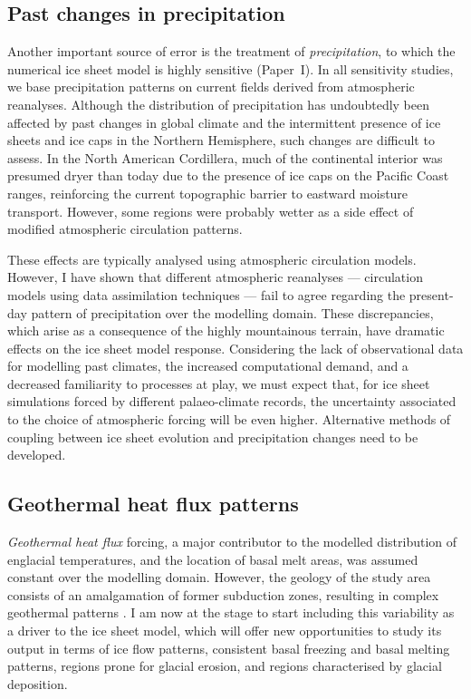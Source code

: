 \documentclass[a4paper]{kappa}
\newcommand{\CCLI}[0]{Paper~I}      %
\begin{document}
\subsection{Past changes in precipitation}

Another important source of error is the treatment of \emph{precipitation}, to
which
the numerical ice sheet model is highly sensitive (\CCLI). In all sensitivity
studies, we base precipitation patterns on current fields derived from
atmospheric
reanalyses. Although the distribution of precipitation has undoubtedly
been affected by past changes in global climate and the intermittent presence
of ice sheets and ice caps in the Northern Hemisphere, such changes are
difficult to assess. In the North American Cordillera, much of the continental
interior was presumed dryer than today due to the presence of ice caps on the
Pacific Coast ranges, reinforcing the current topographic barrier to eastward
moisture transport. However,
some regions were probably wetter as a side effect of modified atmospheric
circulation patterns.

These effects are typically analysed using atmospheric
circulation models. However, I have shown that different atmospheric reanalyses
--- circulation models using data assimilation techniques --- fail to agree
regarding the present-day pattern of precipitation over the modelling domain.
These discrepancies, which arise as a consequence of the highly mountainous
terrain, have dramatic effects on the ice sheet model response. Considering the
lack of observational data for modelling past climates, the increased
computational demand, and a decreased familiarity to processes at play, we must
expect that, for ice sheet simulations forced by different palaeo-climate
records, the uncertainty associated to the choice of atmospheric forcing
will be even higher. Alternative methods of coupling between ice sheet
evolution and precipitation changes need to be developed.


\subsection{Geothermal heat flux patterns}

\emph{Geothermal heat flux} forcing, a major contributor to the modelled
distribution
of englacial temperatures, and the location of basal melt areas, was assumed
constant over the modelling domain. However, the geology of the study area
consists of an amalgamation of former subduction zones, resulting in complex
geothermal patterns \citep{Blackwell.Richards.2004}. I am now at the stage to
start including this variability as a driver to the ice sheet model, which will
offer new opportunities to study its output in terms of ice flow patterns,
consistent basal freezing and basal melting patterns, regions prone for glacial
erosion, and regions characterised by glacial deposition.
\end{document}
